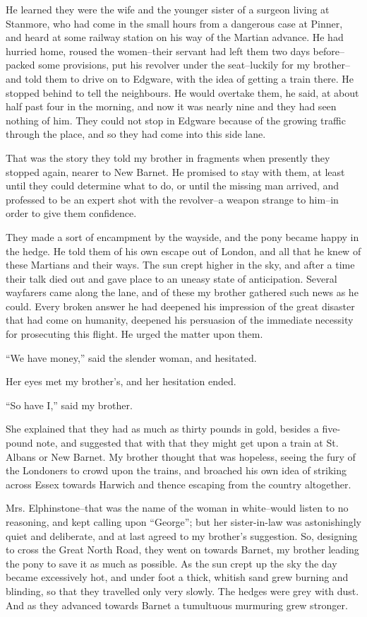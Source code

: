 He learned they were the wife and the younger sister of a surgeon
living at Stanmore, who had come in the small hours from a
dangerous case at Pinner, and heard at some railway station on his
way of the Martian advance. He had hurried home, roused the
women--their servant had left them two days before--packed some
provisions, put his revolver under the seat--luckily for my
brother--and told them to drive on to Edgware, with the idea of
getting a train there. He stopped behind to tell the neighbours. He
would overtake them, he said, at about half past four in the
morning, and now it was nearly nine and they had seen nothing of
him. They could not stop in Edgware because of the growing traffic
through the place, and so they had come into this side lane.

That was the story they told my brother in fragments when presently
they stopped again, nearer to New Barnet. He promised to stay with
them, at least until they could determine what to do, or until the
missing man arrived, and professed to be an expert shot with the
revolver--a weapon strange to him--in order to give them
confidence.

They made a sort of encampment by the wayside, and the pony became
happy in the hedge. He told them of his own escape out of London,
and all that he knew of these Martians and their ways. The sun
crept higher in the sky, and after a time their talk died out and
gave place to an uneasy state of anticipation. Several wayfarers
came along the lane, and of these my brother gathered such news as
he could. Every broken answer he had deepened his impression of the
great disaster that had come on humanity, deepened his persuasion
of the immediate necessity for prosecuting this flight. He urged
the matter upon them.

``We have money,'' said the slender woman, and hesitated.

Her eyes met my brother's, and her hesitation ended.

``So have I,'' said my brother.

She explained that they had as much as thirty pounds in gold,
besides a five-pound note, and suggested that with that they might
get upon a train at St. Albans or New Barnet. My brother thought
that was hopeless, seeing the fury of the Londoners to crowd upon
the trains, and broached his own idea of striking across Essex
towards Harwich and thence escaping from the country altogether.

Mrs. Elphinstone--that was the name of the woman in white--would
listen to no reasoning, and kept calling upon ``George''; but her
sister-in-law was astonishingly quiet and deliberate, and at last
agreed to my brother's suggestion. So, designing to cross the Great
North Road, they went on towards Barnet, my brother leading the
pony to save it as much as possible. As the sun crept up the sky
the day became excessively hot, and under foot a thick, whitish
sand grew burning and blinding, so that they travelled only very
slowly. The hedges were grey with dust. And as they advanced
towards Barnet a tumultuous murmuring grew stronger.


